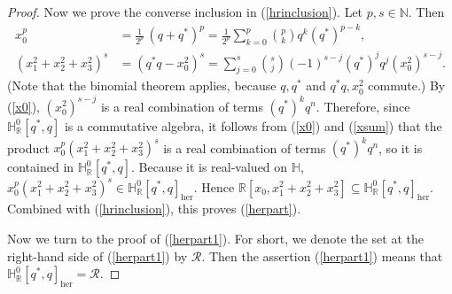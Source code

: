 \documentclass[11pt,a4paper]{amsart}
\theoremstyle{definition}
\begin{document}
\begin{proof}
Now we prove the converse inclusion in (\ref{hrinclusion}). Let
$p,s\in \mathbb{N}$. Then
%
\begin{align}
x_{0}^{p} & = \frac{1}{2^{p}}\, (q+q^{*})^{p} = \frac{1}{2^{p}} \sum _{k=0}^{p}
\binom{p}{k} q^{k} (q^{*})^{p-k},
\label{x0}
\\
(x_{1}^{2}+x_{2}^{2}+x_{3}^{2})^{s} & = (q^{*}q - x_{0}^{2})^{s} =
\sum _{j=0}^{s} \binom{s}{j} (-1)^{s-j} (q^{*})^{j} q^{j} (x_{0}^{2})^{s-j}.
\label{xsum}
\end{align}
%
(Note that the binomial theorem applies, because $q,q^{*}$ and
$q^{*}q, x_{0}^{2}$ commute.) By (\ref{x0}), $(x_{0}^{2})^{s-j}$ is a real
combination of terms $(q^{*})^{k}q^{n}$. Therefore, since
$\mathbb{H}^{0}_{\mathbb R}[q^{*}, q]$ is a commutative algebra, it follows
from (\ref{x0}) and (\ref{xsum}) that the product
$x_{0}^{p}(x_{1}^{2}+x_{2}^{2}+x_{3}^{2})^{s}$ is a real combination of
terms $(q^{*})^{k}q^{n}$, so it is contained in
$ \mathbb{H}^{0}_{\mathbb{R}}[q^{*}, q]$. Because it is real-valued on
$\mathbb{H}$,
$x_{0}^{p}(x_{1}^{2}+x_{2}^{2}+x_{3}^{2})^{s} \in \mathbb{H}^{0}_{
\mathbb R}[q^{*}, q]_{\mathrm{her}}$. Hence
$ \mathbb{R}[x_{0},x_{1}^{2}+x_{2}^{2}+x_{3}^{2}]\subseteq \mathbb{H}^{0}_{
\mathbb R}[q^{*}, q]_{\mathrm{her}} $. Combined with (\ref{hrinclusion}),
this proves (\ref{herpart}).

Now we turn to the proof of (\ref{herpart1}). For short, we denote the
set at the right-hand side of (\ref{herpart1}) by $\mathcal{R}$. Then the
assertion (\ref{herpart1}) means that
$ \mathbb{H}^{0}_{\mathbb R}[q^{*}, q]_{\mathrm{her}}=\mathcal{R}$.


\end{proof}
\end{document}
